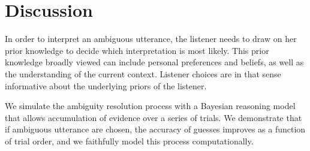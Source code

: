\documentclass[10pt,a4paper]{article}
\begin{document}
\section{Discussion}

In order to interpret an ambiguous utterance, the listener needs to draw on her prior knowledge to decide which interpretation is most likely. This prior knowledge broadly viewed can include personal preferences and beliefs, as well as the understanding of the current context. Listener choices are in that sense informative about the underlying priors of the listener. 

We simulate the ambiguity resolution process with a Bayesian reasoning model that allows accumulation of evidence over a series of trials. We demonstrate that if ambiguous utterance are chosen, the accuracy of guesses improves as a function of trial order, and we faithfully model this process computationally.


%
%


\setlength{\bibleftmargin}{.125in}
\setlength{\bibindent}{-\bibleftmargin}


\end{document}
